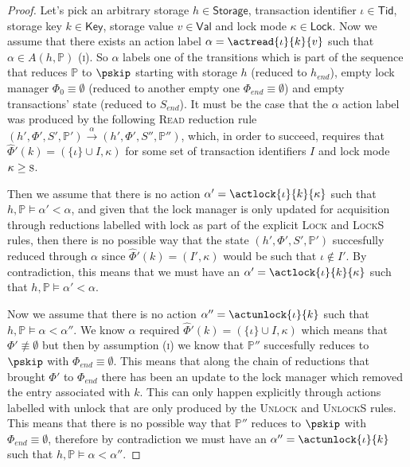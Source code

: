 \begin{proof}
Let's pick an arbitrary storage $h \in \mathsf{Storage}$, transaction identifier $\iota \in \mathsf{Tid}$, storage key $k \in \mathsf{Key}$, storage value $v \in \mathsf{Val}$ and lock mode $\kappa \in \mathsf{Lock}$. Now we assume that there exists an action label $\alpha = \actread{\iota}{k}{v}$ such that $\alpha \in A(h, \mathds{P})$ (\textsc{i}). So $\alpha$ labels one of the transitions which is part of the sequence that reduces $\mathds{P}$ to $\pskip$ starting with storage $h$ (reduced to $h_{end}$), empty lock manager $\Phi_0 \equiv \emptyset$ (reduced to another empty one $\Phi_{end} \equiv \emptyset$) and empty transactions' state (reduced to $S_{end}$). It must be the case that the $\alpha$ action label was produced by the following \textsc{Read} reduction rule $(h', \Phi', S', \mathds{P}') \xrightarrow{\alpha} (h', \Phi', S'', \mathds{P}'')$, which, in order to succeed, requires that $\hat{\Phi}'(k) = (\{ \iota \} \cup I, \kappa)$ for some set of transaction identifiers $I$ and lock mode $\kappa \geq \textsc{s}$.

Then we assume that there is no action $\alpha' = \actlock{\iota}{k}{\kappa}$ such that $h, \mathds{P} \vDash \alpha' < \alpha$, and given that the lock manager is only updated for acquisition through reductions labelled with \textsf{lock} as part of the explicit \textsc{Lock} and \textsc{LockS} rules, then there is no possible way that the state $(h', \Phi', S', \mathds{P}')$ succesfully reduced through $\alpha$ since $\hat{\Phi}'(k) = (I'
, \kappa)$ would be such that $\iota \not\in I'$. By contradiction, this means that we must have an $\alpha' = \actlock{\iota}{k}{\kappa}$ such that $h, \mathds{P} \vDash \alpha' < \alpha$.

Now we assume that there is no action $\alpha'' = \actunlock{\iota}{k}$ such that $h, \mathds{P} \vDash \alpha < \alpha ''$. We know $\alpha$ required $\hat{\Phi}'(k) = (\{ \iota \} \cup I, \kappa)$ which means that $\Phi' \not\equiv \emptyset$ but then by assumption (\textsc{i}) we know that $\mathds{P}''$ succesfully reduces to $\pskip$ with $\Phi_{end} \equiv \emptyset$. This means that along the chain of reductions that brought $\Phi'$ to $\Phi_{end}$ there has been an update to the lock manager which removed the entry associated with $k$. This can only happen explicitly through actions labelled with \textsf{unlock} that are only produced by the \textsc{Unlock} and \textsc{UnlockS} rules. This means that there is no possible way that $\mathds{P}''$ reduces to $\pskip$ with $\Phi_{end} \equiv \emptyset$, therefore by contradiction we must have an $\alpha'' = \actunlock{\iota}{k}$ such that $h, \mathds{P} \vDash \alpha < \alpha ''$.
\end{proof}

